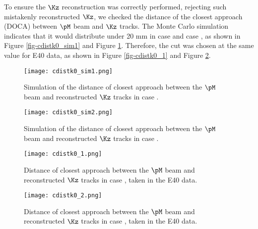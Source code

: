 To ensure the $\Kz$ reconstruction was correctly performed, rejecting such mistakenly reconstructed $\Kz$, we checked the distance of the closest approach (DOCA) between $\pM$ beam and $\Kz$ tracks. The Monte Carlo simulation indicates that it would distribute under 20 mm in case  and case , as shown in Figure \ref{fig-cdistk0_sim1} and Figure \ref{fig-cdistk0_sim2}. Therefore, the cut was chosen at the same value for E40 data, as shown in Figure \ref{fig-cdistk0_1} and Figure \ref{fig-cdistk0_2}.

\begin{figure}[!h]
  \begin{minipage}[t]{0.48\columnwidth}
    \centering
    \texttt{[image: cdistk0\_sim1.png]}
    \caption{Simulation of the distance of closest approach between the $\pM$ beam and reconstructed $\Kz$ tracks in case .}
    \label{fig-cdistk0_sim1}
  \end{minipage}
  \hspace{0.04\columnwidth} %
  \begin{minipage}[t]{0.48\columnwidth}
    \centering
    \texttt{[image: cdistk0\_sim2.png]}
    \caption{Simulation of the distance of closest approach between the $\pM$ beam and reconstructed $\Kz$ tracks in case .}
    \label{fig-cdistk0_sim2}
  \end{minipage}
\end{figure}

\begin{figure}[!h]
  \begin{minipage}[t]{0.48\columnwidth}
    \centering
    \texttt{[image: cdistk0\_1.png]}
    \caption{Distance of closest approach between the $\pM$ beam and reconstructed $\Kz$ tracks in case , taken in the E40 data.}
    \label{fig-cdistk0_1}
  \end{minipage}
  \hspace{0.04\columnwidth} %
  \begin{minipage}[t]{0.48\columnwidth}
    \centering
    \texttt{[image: cdistk0\_2.png]}
    \caption{Distance of closest approach between the $\pM$ beam and reconstructed $\Kz$ tracks in case , taken in the E40 data.}
    \label{fig-cdistk0_2}
  \end{minipage}
\end{figure}



